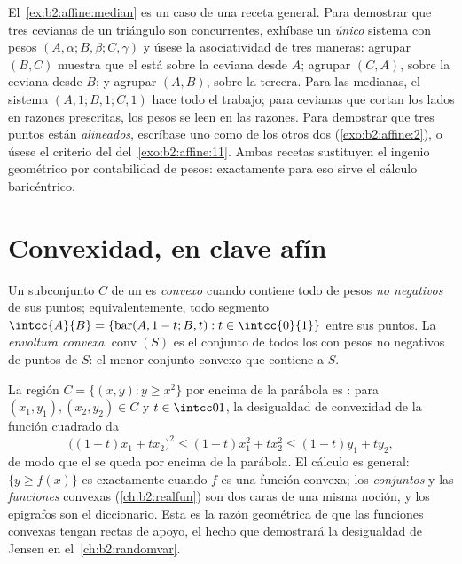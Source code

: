 \begin{remark}
El~\cref{ex:b2:affine:median} es un caso de una receta general. Para
demostrar que tres cevianas de un triángulo son concurrentes,
exhíbase un \emph{único} sistema con pesos $(A, \alpha; B, \beta; C,
\gamma)$ y úsese la asociatividad de tres maneras: agrupar $(B, C)$
muestra que el  está sobre la ceviana desde $A$; agrupar
$(C, A)$, sobre la ceviana desde $B$; y agrupar $(A, B)$, sobre la
tercera. Para las medianas, el sistema $(A, 1; B, 1; C, 1)$ hace todo
el trabajo; para cevianas que cortan los lados en razones
prescritas, los pesos se leen en las razones. Para demostrar que tres
puntos están \emph{alineados}, escríbase uno como  de los
otros dos (\cref{exo:b2:affine:2}), o úsese el criterio del
 del~\cref{exo:b2:affine:11}. Ambas recetas sustituyen el
ingenio geométrico por contabilidad de pesos: exactamente para eso
sirve el cálculo baricéntrico.
\end{remark}

\section{Convexidad, en clave afín}

\begin{definition}\label{def:b2:affine:convex}
Un subconjunto $C$ de un  es \emph{convexo} cuando contiene todo  de pesos \emph{no
negativos} de sus puntos; equivalentemente, todo segmento
$\intcc{A}{B} = \{\operatorname{bar}(A, 1-t; B, t) : t \in
\intcc{0}{1}\}$ entre sus puntos. La \emph{envoltura
convexa} $\operatorname{conv}(S)$ es el
conjunto de todos los  con pesos no negativos de puntos
de $S$: el menor conjunto convexo que contiene a $S$.
\end{definition}

\begin{example}\label{ex:b2:affine:epigraph}
La región $C = \{(x, y) : y \geq x^2\}$ por encima de la parábola es
: para $(x_1, y_1), (x_2, y_2) \in C$ y $t \in \intcc01$, la
desigualdad de convexidad de la función cuadrado da
\[
\bigl((1-t)x_1 + tx_2\bigr)^2 \leq (1-t)x_1^2 + tx_2^2
\leq (1-t)y_1 + ty_2 ,
\]
de modo que el  se queda por encima de la parábola. El
cálculo es general: $\{y \geq f(x)\}$ es  exactamente cuando
$f$ es una función convexa; los \emph{conjuntos}  y las
\emph{funciones} convexas (\cref{ch:b2:realfun}) son dos caras de una
misma noción, y los epigrafos son el diccionario. Esta es la razón
geométrica de que las funciones convexas tengan rectas de apoyo, el
hecho que demostrará la desigualdad de Jensen en el~\cref{ch:b2:randomvar}.
\end{example}


